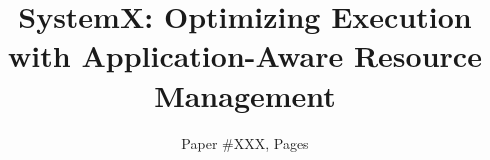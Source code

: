 \documentclass[letterpaper,twocolumn,10pt]{article}
\date{}
\theoremstyle{plain}
\theoremstyle{definition}
\begin{document}
	

	\date{}
	
  \title{\Large \bf SystemX: Optimizing Execution with Application-Aware Resource Management}

	
	\author{Paper \#XXX, \pageref{EndOfPaper} Pages}
	
	
	\pagestyle{plain}
	
	
	\maketitle
	

  \begin{abstract}
	
  \end{abstract}

	
	
	
	
	
	
	
	
  \label{EndOfPaper}
	

	\newpage
	{
		
		
	}
	\clearpage


	
	
\end{document}
